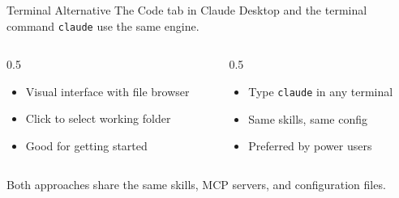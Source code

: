 \documentclass[aspectratio=169]{beamer}
\begin{document}
\begin{frame}{Terminal Alternative}
The Code tab in Claude Desktop and the terminal command \texttt{claude} use the \alert{same engine}.
\vspace{0.3cm}
\begin{columns}[T]
\begin{column}{0.5\textwidth}
\begin{shadedbox}[title=\textbf{Claude Desktop (Code tab)}]
\begin{itemize}\small
  \item Visual interface with file browser
  \item Click to select working folder
  \item Good for getting started
\end{itemize}
\end{shadedbox}
\end{column}
\begin{column}{0.5\textwidth}
\begin{shadedbox}[title=\textbf{Terminal (\texttt{claude})}]
\begin{itemize}\small
  \item Type \texttt{claude} in any terminal
  \item Same skills, same config
  \item Preferred by power users
\end{itemize}
\end{shadedbox}
\end{column}
\end{columns}
\vspace{0.3cm}
Both approaches share the same skills, MCP servers, and configuration files.
\end{frame}
\end{document}
